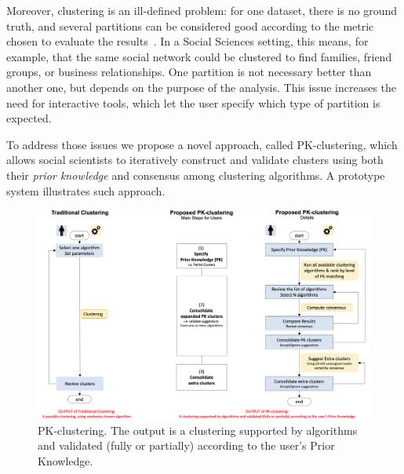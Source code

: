 Moreover, clustering is an ill-defined problem: for one dataset, there is no ground truth, and several partitions can be considered good according to the metric chosen to evaluate the results~\cite{kleinbergImpossibilityTheoremClustering2002}.
In a Social Sciences setting, this means, for example, that the same social network could be clustered to find families, friend groups, or business relationships.
One partition is not necessary better than another one, but depends on the purpose of the analysis.
This issue increases the need for interactive tools, which let the user specify which type of partition is expected.

To address those issues we propose a novel approach, called PK-clustering, which allows social scientists to iteratively construct and validate clusters using both their \emph{prior knowledge} and consensus among clustering algorithms.
A prototype system illustrates such approach.



\begin{figure}
    \centering
    \includegraphics[width=\textwidth]{static/figures/PK-Clustering/VISPaperFigures/pkprocess}
    \caption{PK-clustering. The output is a clustering supported by algorithms and validated (fully or partially) according to the user's Prior Knowledge.}
\label{fig:PK-processes}
\end{figure}

